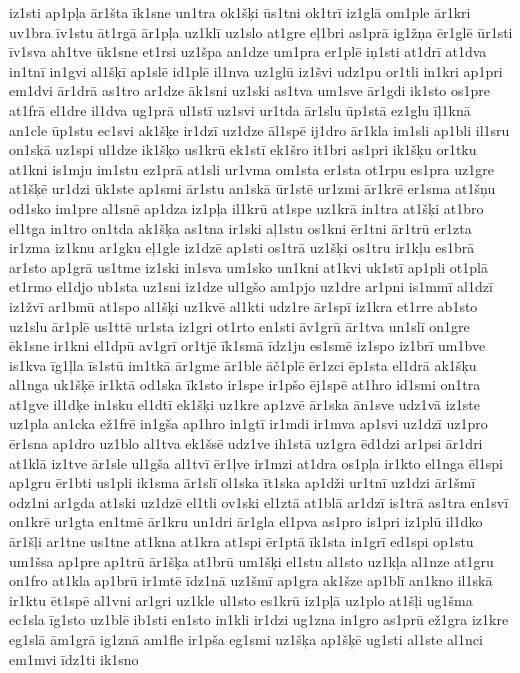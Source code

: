 {iz1sti
ap1pļa
ār1šta
īk1sne
un1tra
ok1šķi
ūs1tni
ok1trī
iz1glā
om1ple
ār1kri
uv1bra
īv1stu
āt1rgā
ār1pļa
uz1klī
uz1slo
at1gre
eļ1bri
as1prā
ig1žņa
ēr1glē
ūr1sti
īv1sva
ah1tve
ūk1sne
et1rsi
uz1špa
an1dze
um1pra
er1plē
iņ1sti
at1drī
at1dva
in1tnī
in1gvi
al1šķī
ap1slē
id1plē
il1nva
uz1glū
iz1švi
udz1pu
or1tli
in1kri
ap1pri
em1dvi
ār1drā
as1tro
ar1dze
āk1sni
uz1ski
as1tva
um1sve
ār1gdi
ik1sto
os1pre
at1frā
el1dre
il1dva
ug1prā
ul1stī
uz1svi
ur1tda
ār1slu
ūp1stā
ez1glu
īļ1knā
an1cle
ūp1stu
ec1svi
ak1šķe
ir1dzī
uz1dze
āl1spē
ij1dro
ār1kla
im1sli
ap1bli
il1sru
on1skā
uz1spi
ul1dze
ik1šķo
us1krū
ek1stī
ek1šro
it1bri
as1pri
ik1šķu
or1tku
at1kni
is1mju
im1stu
ez1prā
at1sli
ur1vma
om1sta
er1sta
ot1rpu
es1pra
uz1gre
at1šķē
ur1dzi
ūk1ste
ap1smi
ār1stu
an1skā
ūr1stē
ur1zmi
ār1krē
er1sma
at1šņu
od1sko
im1pre
al1snē
ap1dza
iz1pļa
il1krū
at1spe
uz1krā
in1tra
at1šķi
at1bro
el1tga
in1tro
on1tda
ak1šķa
as1tna
ir1ski
aļ1stu
os1kni
ēr1tni
ār1trū
er1zta
ir1zma
iz1knu
ar1gku
eļ1gle
iz1dzē
ap1sti
os1trā
uz1šķi
os1tru
ir1kļu
es1brā
ar1sto
ap1grā
us1tme
iz1ski
in1sva
um1sko
un1kni
at1kvi
uk1stī
ap1pli
ot1plā
et1rmo
el1djo
ub1sta
uz1sni
iz1dze
ul1gšo
am1pjo
uz1dre
ar1pni
is1mmī
al1dzī
iz1žvī
ar1bmū
at1spo
al1šķi
uz1kvē
al1kti
udz1re
ār1spī
iz1kra
et1rre
ab1sto
uz1slu
ār1plē
us1ttē
ur1sta
iz1gri
ot1rto
en1sti
āv1grū
ār1tva
un1slī
on1gre
ēk1sne
ir1kni
el1dpū
av1grī
or1tjē
īk1smā
īdz1ju
es1smē
iz1spo
iz1brī
um1bve
is1kva
īg1ļla
īs1stū
im1tkā
ār1gme
ār1ble
āč1plē
ēr1zci
ēp1sta
el1drā
ak1šķu
al1nga
uk1šķē
ir1ktā
od1ska
īk1sto
ir1spe
ir1pšo
ēj1spē
at1hro
id1smi
on1tra
at1gve
il1dķe
in1sku
el1dtī
ek1šķi
uz1kre
ap1zvē
ār1ska
ān1sve
udz1vā
iz1ste
uz1pla
an1cka
ež1frē
in1gša
ap1hro
in1gtī
ir1mdi
ir1mva
ap1svi
uz1dzī
uz1pro
ēr1sna
ap1dro
uz1blo
al1tva
ek1šsē
udz1ve
ih1stā
uz1gra
ēd1dzi
ar1psi
ār1dri
at1klā
iz1tve
ār1sle
ul1gša
al1tvī
ēr1ļve
ir1mzi
at1dra
os1pļa
ir1kto
el1nga
ēl1spi
ap1gru
ēr1bti
us1pli
ik1sma
ār1slī
ol1ska
īt1ska
ap1dži
ur1tnī
uz1dzi
ār1šmī
odz1ni
ar1gda
at1ski
uz1dzē
el1tli
ov1ski
el1ztā
at1blā
ar1dzī
is1trā
as1tra
en1svī
on1krē
ur1gta
en1tmē
ār1kru
un1dri
ār1gla
el1pva
as1pro
is1pri
iz1plū
il1dko
ār1šļi
ar1tne
us1tne
at1kna
at1kra
at1spi
ēr1ptā
īk1sta
in1grī
ed1spi
op1stu
um1šsa
ap1pre
ap1trū
ār1šķa
at1brū
um1šķi
el1stu
al1sto
uz1kļa
al1nze
at1gru
on1fro
at1kla
ap1brū
ir1mtē
īdz1nā
uz1šmī
ap1gra
ak1šze
ap1blī
an1kno
il1skā
ir1ktu
ēt1spē
al1vni
ar1gri
uz1kle
ul1sto
es1krū
iz1pļā
uz1plo
at1šļi
ug1šma
ec1sla
īg1sto
uz1blē
ib1sti
en1sto
in1kli
ir1dzi
ug1zna
in1gro
as1prū
ež1gra
iz1kre
eg1slā
ām1grā
ig1znā
am1fle
ir1pša
eg1smi
uz1šķa
ap1šķē
ug1sti
al1ste
al1nci
em1mvi
īdz1ti
ik1sno
}
